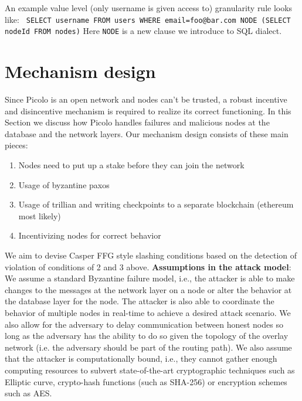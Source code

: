 \documentclass[preprint,10pt]{elsarticle}
\begin{document}
An example value level (only username is given access to) granularity rule looks like:\newline \newline
\texttt{ SELECT username \newline FROM users \newline WHERE email=foo@bar.com \newline NODE (SELECT nodeId FROM nodes)}
\newline
\newline
Here \texttt{NODE} is a new clause we introduce to SQL dialect.

\section{Mechanism design}
Since Picolo is an open network and nodes can't be trusted, a robust incentive and disincentive mechanism is required to realize its correct functioning. In this Section we discuss how Picolo handles failures and malicious nodes at the database and the network layers. Our mechanism design consists of these main pieces:
\begin{enumerate}
	\item Nodes need to put up a stake before they can join the network
	\item Usage of byzantine paxos
	\item Usage of trillian and writing checkpoints to a separate blockchain (ethereum most likely)
	\item Incentivizing nodes for correct behavior
\end{enumerate}
We aim to devise Casper FFG style slashing conditions based on the detection of violation of conditions of 2 and 3 above.
\newline\newline
\textbf{Assumptions in the attack model}: We assume a standard Byzantine failure model, i.e., the attacker is able to make changes to the messages at the network layer on a node or alter the behavior at the database layer for the node. The attacker is also able to coordinate the behavior of multiple nodes in real-time to achieve a desired attack scenario. We also allow for the adversary to delay communication between honest nodes so long as the adversary has the ability to do so given the topology of the overlay network (i.e. the adversary should be part of the routing path). We also assume that the attacker is computationally bound, i.e., they cannot gather enough computing resources to subvert state-of-the-art cryptographic techniques such as Elliptic curve, crypto-hash functions (such as SHA-256) or encryption schemes such as AES.
\end{document}
